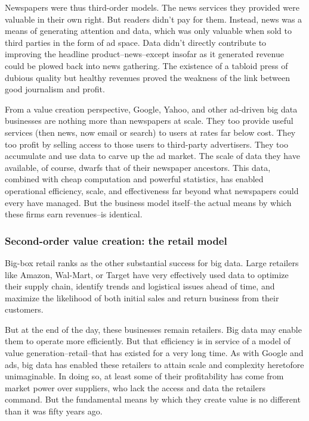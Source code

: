 \documentclass[12pt]{article}
\begin{document}
Newspapers were thus third-order models. The news services they
provided were valuable in their own right. But readers didn't pay for
them. Instead, news was a means of generating attention and data,
which was only valuable when sold to third parties in the form of ad
space. Data didn't directly contribute to improving the headline
product--news--except insofar as it generated revenue could be plowed
back into news gathering. The existence of a tabloid press of dubious
quality but healthy revenues proved the weakness of the link between
good journalism and profit.

From a value creation perspective, Google, Yahoo, and other ad-driven
big data businesses are nothing more than newspapers at scale. They
too provide useful services (then news, now email or search) to users
at rates far below cost. They too profit by selling access to those
users to third-party advertisers. They too accumulate and use data to
carve up the ad market. The scale of data they have available, of
course, dwarfs that of their newspaper ancestors. This data, combined
with cheap computation and powerful statistics, has enabled
operational efficiency, scale, and effectiveness far beyond what
newspapers could every have managed. But the business model
itself--the actual means by which these firms earn revenues--is
identical.

\subsubsection{Second-order value creation: the retail model}
\label{sec:second-order-value}


Big-box retail ranks as the other substantial success for big
data. Large retailers like Amazon, Wal-Mart, or Target have very
effectively used data to optimize their supply chain, identify trends
and logistical issues ahead of time, and maximize the likelihood of
both initial sales and return business from their customers. 

But at the end of the day, these businesses remain retailers. Big data
may enable them to operate more efficiently. But that efficiency is in
service of a model of value generation--retail--that has existed for a
very long time. As with Google and ads, big data has enabled these
retailers to attain scale and complexity heretofore unimaginable. In
doing so, at least some of their profitability has come from market
power over suppliers, who lack the access and data the retailers
command. But the fundamental means by which they create value is no
different than it was fifty years ago.
\end{document}
